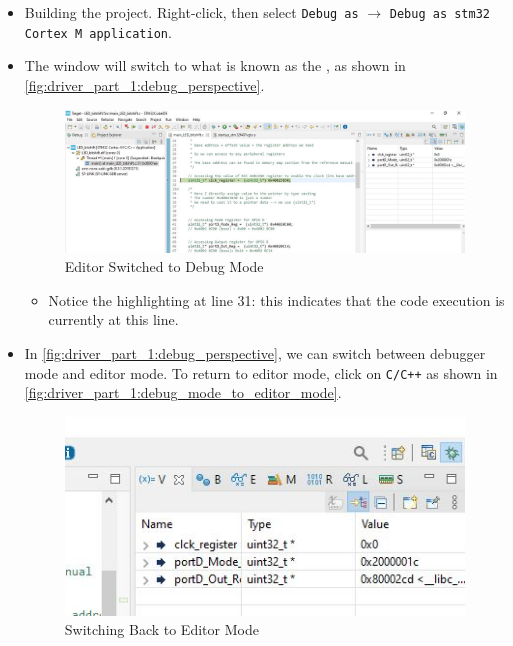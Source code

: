 \begin{itemize}
    \item Building the project. Right-click, then select \verb|Debug as| $\rightarrow$ \verb|Debug as stm32 Cortex M application|.


    \item The window will switch to what is known as the , as shown in \autoref{fig:driver_part_1:debug_perspective}.

\begin{figure}[h]
\centering
\includegraphics[scale=0.5]{Figures/driver_part_1/debug_perspective}
\caption{Editor Switched to Debug Mode}
\label{fig:driver_part_1:debug_perspective}
\end{figure}

    \begin{itemize}
        \item Notice the highlighting at line 31: this indicates that the code execution is currently at this line.
    \end{itemize}


\newpage

\item In \autoref{fig:driver_part_1:debug_perspective}, we can switch between debugger mode and editor mode. To return to editor mode, click on \verb|C/C++| as shown in \autoref{fig:driver_part_1:debug_mode_to_editor_mode}.

\begin{figure}[h]
\centering
\includegraphics[scale=0.5]{Figures/driver_part_1/debug_mode_to_editor_mode}
\caption{Switching Back to Editor Mode}
\label{fig:driver_part_1:debug_mode_to_editor_mode}
\end{figure}


\end{itemize}
